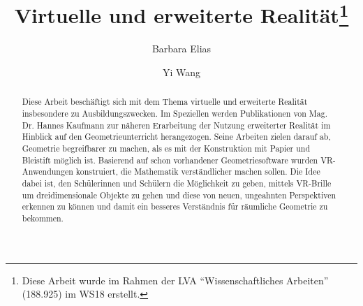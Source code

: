 \documentclass[deutsch]{llncs}
\begin{document}
\def\abstractname{Kurzfassung.}

\pagestyle{plain}

\title{Virtuelle und erweiterte Realität\thanks{Diese Arbeit wurde im Rahmen der LVA ``Wissenschaftliches Arbeiten'' (188.925) im WS18 erstellt.}}




\author{Barbara Elias \and Yi Wang}


\maketitle

\setcounter{footnote}{0}

\begin{abstract}
Diese Arbeit beschäftigt sich mit dem Thema virtuelle und erweiterte Realität insbesondere zu Ausbildungszwecken. Im Speziellen werden Publikationen von Mag. Dr. Hannes Kaufmann zur näheren Erarbeitung der Nutzung erweiterter Realität im Hinblick auf den Geometrieunterricht herangezogen. Seine Arbeiten zielen darauf ab, Geometrie begreifbarer zu machen, als es mit der Konstruktion mit Papier und Bleistift möglich ist. Basierend auf schon vorhandener Geometriesoftware wurden VR-Anwendungen konstruiert, die Mathematik verständlicher machen sollen. Die Idee dabei ist, den Schülerinnen und Schülern die Möglichkeit zu geben, mittels VR-Brille um dreidimensionale Objekte zu gehen und diese von neuen, ungeahnten Perspektiven erkennen zu können und damit ein besseres Verständnis für räumliche Geometrie zu bekommen.
\end{abstract}
\end{document}
